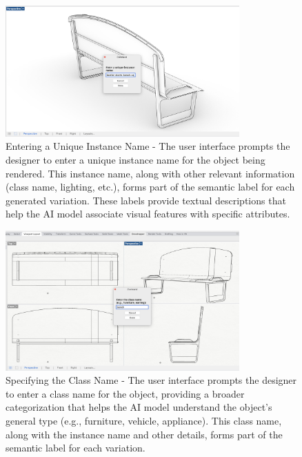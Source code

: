 \documentclass[12pt]{report}
\begin{document}
\begin{figure}[h]
    \centering
    \includegraphics[width=0.8\textwidth]{figures/figure-process-instance-name-barrier-1up-xy-monochrome.jpg}
    \caption{Entering a Unique Instance Name - The user interface prompts the designer to enter a unique instance name for the object being rendered. This instance name, along with other relevant information (class name, lighting, etc.), forms part of the semantic label for each generated variation. These labels provide textual descriptions that help the AI model associate visual features with specific attributes.}
    \label{fig:instance_name_input}
\end{figure}

\begin{figure}[h]
    \centering
    \includegraphics[width=0.8\textwidth]{figures/figure-process-class-name-bench-4up-bw.jpg}
    \caption{Specifying the Class Name - The user interface prompts the designer to enter a class name for the object, providing a broader categorization that helps the AI model understand the object's general type (e.g., furniture, vehicle, appliance). This class name, along with the instance name and other details, forms part of the semantic label for each variation.}
    \label{fig:class_name_input}
\end{figure}
\end{document}
